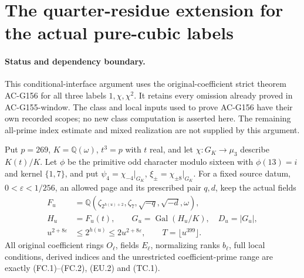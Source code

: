 \section{The quarter-residue extension for the actual pure-cubic labels}
\label{sec:pure-cubic-quarter-window}

\paragraph{Status and dependency boundary.}
This conditional-interface argument uses the original-coefficient
strict theorem AC-G156 for all three labels $1,\chi,\chi^2$.
It retains every omission already proved in AC-G155-window.
The class and local inputs used to prove AC-G156 have their own
recorded scopes; no new class computation is asserted here.
The remaining all-prime index estimate and mixed realization
are not supplied by this argument.

Put $p=269$, $K=\mathbb Q(\omega)$, $t^3=p$ with $t$ real,
and let $\chi:G_K\to\mu_3$ describe $K(t)/K$.
Let $\phi$ be the primitive odd character modulo sixteen with
$\phi(13)=i$ and kernel $\{1,7\}$, and put
$\psi_4=\chi_{-4}|_{G_K}$, $\xi_\pm=\chi_{\pm8}|_{G_K}$.
For a fixed source datum, $0<\varepsilon<1/256$, an allowed
page and its prescribed pair $q,d$, keep the actual fields
\[
 \begin{aligned}
 F_u&=\mathbb Q(\zeta_{2^{h(u)+2}},\zeta_7,
                           \sqrt{-q},\sqrt{-d},\omega),\\
 H_u&=F_u(t),\qquad G_u=\operatorname{Gal}(H_u/K),\quad D_u=|G_u|,\\
 u^{2+8\varepsilon}&\leq2^{h(u)}\leq2u^{2+8\varepsilon},
                      \qquad T=\lfloor u^{399}\rfloor.
 \end{aligned}
 \tag{PCQW.1}
\]
All original coefficient rings $O_\ell$, fields $E_\ell$,
normalizing ranks $b_\ell$, full local conditions, derived
indices and the unrestricted coefficient-prime range are
exactly (FC.1)--(FC.2), (EU.2) and (TC.1).

